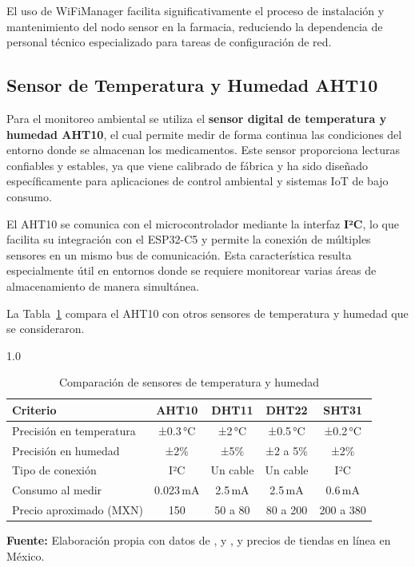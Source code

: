 El uso de WiFiManager facilita significativamente el proceso de instalación y mantenimiento del nodo sensor en la farmacia, reduciendo la dependencia de personal técnico especializado para tareas de configuración de red.

\subsection{Sensor de Temperatura y Humedad AHT10}

Para el monitoreo ambiental se utiliza el \textbf{sensor digital de temperatura y humedad AHT10}, el cual permite medir de forma continua las condiciones del entorno donde se almacenan los medicamentos. Este sensor proporciona lecturas confiables y estables, ya que viene calibrado de fábrica y ha sido diseñado específicamente para aplicaciones de control ambiental y sistemas IoT de bajo consumo.

El AHT10 se comunica con el microcontrolador mediante la interfaz \textbf{I²C}, lo que facilita su integración con el ESP32-C5 y permite la conexión de múltiples sensores en un mismo bus de comunicación. Esta característica resulta especialmente útil en entornos donde se requiere monitorear varias áreas de almacenamiento de manera simultánea.

La Tabla~\ref{tab:cap2-comparativa-sensores} compara el AHT10 con otros sensores de temperatura y humedad que se consideraron.

\begin{table}[H]
\centering
\caption{Comparación de sensores de temperatura y humedad}
\label{tab:cap2-comparativa-sensores}
\begin{spacing}{1.0}
\renewcommand{\arraystretch}{1.2}
\begin{tabularx}{\textwidth}{@{}>{\raggedright}X c c c c@{}}
\toprule
\textbf{Criterio} & \textbf{AHT10} & \textbf{DHT11} & \textbf{DHT22} & \textbf{SHT31} \\
\midrule
Precisión en temperatura & ±0.3\,°C & ±2\,°C & ±0.5\,°C & ±0.2\,°C \\
Precisión en humedad & ±2\% & ±5\% & ±2 a 5\% & ±2\% \\
Tipo de conexión & I²C & Un cable & Un cable & I²C \\
Consumo al medir & 0.023\,mA & 2.5\,mA & 2.5\,mA & 0.6\,mA \\
Precio aproximado (MXN) & 150 & 50 a 80 & 80 a 200 & 200 a 380 \\
\bottomrule
\end{tabularx}
\end{spacing}
\vspace{0.2cm}
{\footnotesize \textbf{Fuente:} Elaboración propia con datos de \cite{aht10-datasheet}, \cite{adafruit-dht} y \cite{sensirion-sht3x}, y precios de tiendas en línea en México.}
\end{table}

